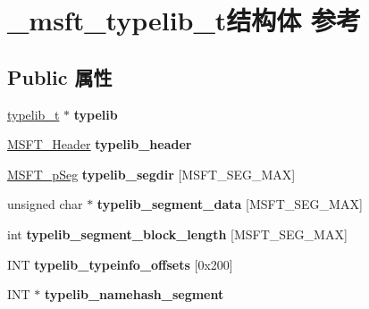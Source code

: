 \hypertarget{struct__msft__typelib__t}{}\section{\+\_\+msft\+\_\+typelib\+\_\+t结构体 参考}
\label{struct__msft__typelib__t}
\subsection*{Public 属性}
\begin{DoxyCompactItemize}
\item 
\mbox{\label{struct__msft__typelib__t_a3c4a7b00fc9021ef3b6564fcda052c05}} 
\hyperlink{struct__typelib__t}{typelib\+\_\+t} $\ast$ {\bfseries typelib}
\item 
\mbox{\label{struct__msft__typelib__t_a78188bfc374e0f07f1519b2cd7452f71}} 
\hyperlink{structtag_m_s_f_t___header}{M\+S\+F\+T\+\_\+\+Header} {\bfseries typelib\+\_\+header}
\item 
\mbox{\label{struct__msft__typelib__t_a5bac2f595c6ce4e25a6167d1bd2e30fa}} 
\hyperlink{structtag_m_s_f_t__p_seg}{M\+S\+F\+T\+\_\+p\+Seg} {\bfseries typelib\+\_\+segdir} \mbox{[}M\+S\+F\+T\+\_\+\+S\+E\+G\+\_\+\+M\+AX\mbox{]}
\item 
\mbox{\label{struct__msft__typelib__t_aa8b77d9025e19d58167e189246989486}} 
unsigned char $\ast$ {\bfseries typelib\+\_\+segment\+\_\+data} \mbox{[}M\+S\+F\+T\+\_\+\+S\+E\+G\+\_\+\+M\+AX\mbox{]}
\item 
\mbox{\label{struct__msft__typelib__t_ab5bfc732e63942d5b419ed0c7539af76}} 
int {\bfseries typelib\+\_\+segment\+\_\+block\+\_\+length} \mbox{[}M\+S\+F\+T\+\_\+\+S\+E\+G\+\_\+\+M\+AX\mbox{]}
\item 
\mbox{\label{struct__msft__typelib__t_a3b78ef5cbd8a2924c6e9d1e960497876}} 
I\+NT {\bfseries typelib\+\_\+typeinfo\+\_\+offsets} \mbox{[}0x200\mbox{]}
\item 
\mbox{\label{struct__msft__typelib__t_a759b07222780ce97983f48c4d38acc54}} 
I\+NT $\ast$ {\bfseries typelib\+\_\+namehash\+\_\+segment}

\end{DoxyCompactItemize}
